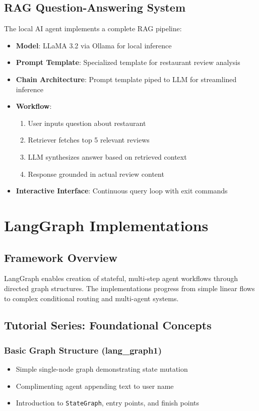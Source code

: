 \documentclass[12pt,a4paper]{article}
\begin{document}
\subsection{RAG Question-Answering System}

The local AI agent implements a complete RAG pipeline:
\begin{itemize}
    \item \textbf{Model}: LLaMA 3.2 via Ollama for local inference
    \item \textbf{Prompt Template}: Specialized template for restaurant review analysis
    \item \textbf{Chain Architecture}: Prompt template piped to LLM for streamlined inference
    \item \textbf{Workflow}:
    \begin{enumerate}
        \item User inputs question about restaurant
        \item Retriever fetches top 5 relevant reviews
        \item LLM synthesizes answer based on retrieved context
        \item Response grounded in actual review content
    \end{enumerate}
    \item \textbf{Interactive Interface}: Continuous query loop with exit commands
\end{itemize}

\section{LangGraph Implementations}

\subsection{Framework Overview}

LangGraph enables creation of stateful, multi-step agent workflows through directed graph structures. The implementations progress from simple linear flows to complex conditional routing and multi-agent systems.

\subsection{Tutorial Series: Foundational Concepts}

\subsubsection{Basic Graph Structure (lang\_graph1)}
\begin{itemize}
    \item Simple single-node graph demonstrating state mutation
    \item Complimenting agent appending text to user name
    \item Introduction to \texttt{StateGraph}, entry points, and finish points
\end{itemize}
\end{document}

